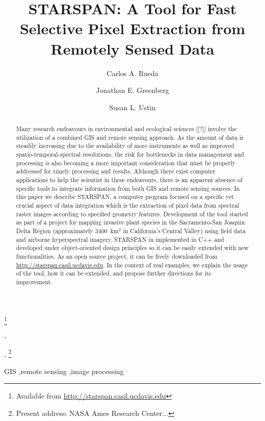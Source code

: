 \documentclass{elsart}
\begin{document}
\begin{frontmatter}

\title{STARSPAN: 
A Tool for Fast Selective Pixel Extraction 
from Remotely Sensed Data}
\thanks[label1]{Available from \url{http://starspan.casil.ucdavis.edu}}

\author{Carlos A. Rueda},
\author{Jonathan E. Greenberg},
\thanks[greenberg]{Present address: NASA Ames Research Center...}
\author{Susan L. Ustin}

\address{Center for Spatial Technologies and Remote Sensing (CSTARS).
The Barn. University of California, Davis. One Shields Avenue, Davis, CA 95616}

\begin{abstract}
	
	Many research endeavours in environmental and ecological sciences [[?]]
	involve the utilization of a combined GIS and remote sensing approach. As
	the amount of data is steadily increasing due to the availability of more
	instruments as well as improved spatio-temporal-spectral resolutions, the
	risk for bottlenecks in data management and processing is also becoming a
	more important consideration that must be properly addressed for timely
	processing and results. Although there exist computer applications to help
	the scientist in these endeavours, there is an apparent absence of specific
	tools to integrate information from both GIS and remote sensing sources. In
	this paper we describe STARSPAN, a computer program focused on a specific
	yet crucial aspect of data integration which is the extraction of pixel data
	from spectral raster images according to specified geometry features.
	Development of the tool started as part of a project for mapping invasive
	plant species in the Sacramento-San Joaquin Delta Region (approximately
	$3400$~km$^2$ in California's Central Valley) using field data and airborne
	hyperspectral imagery. STARSPAN in implemented in C++ and developed under
	object-oriented design principles so it can be easily extended with new
	functionalities. As an open source project, it can be freely downloaded from
	\url{http://starspan.casil.ucdavis.edu}. In the context of real examples, we
	explain the usage of the tool, how it can be extended, and propose further
	directions for its improvement.
	
	
\end{abstract}

\begin{keyword}
GIS \sep remote sensing \sep image processing
\end{keyword}

\end{frontmatter}
\end{document}
